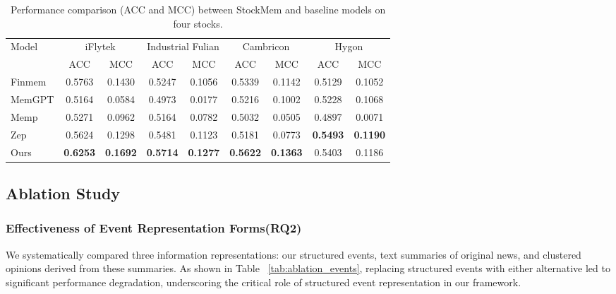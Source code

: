 \documentclass[sigconf, nonacm]{acmart} %
\begin{document}
\begin{table}[h]
\centering
\small
\caption{Performance comparison (ACC and MCC) between StockMem and baseline models on four stocks.}
\label{tab:performance_comparison}
\begin{tabular}{lcccccccc} 
\toprule
\multirow{2}{*}{Model} & \multicolumn{2}{c}{iFlytek} & \multicolumn{2}{c}{Industrial Fulian} & \multicolumn{2}{c}{Cambricon} & \multicolumn{2}{c}{Hygon} \\
\cmidrule(lr){2-3} \cmidrule(lr){4-5} \cmidrule(lr){6-7} \cmidrule(lr){8-9}
 & ACC & MCC & ACC & MCC & ACC & MCC & ACC & MCC \\
\midrule
Finmem & 0.5763 & 0.1430 & 0.5247 & 0.1056 & 0.5339 & 0.1142 & 0.5129 & 0.1052 \\
MemGPT & 0.5164 & 0.0584 & 0.4973 & 0.0177 & 0.5216 & 0.1002 & 0.5228 & 0.1068 \\
Memp & 0.5271 & 0.0962 & 0.5164 & 0.0782 & 0.5032 & 0.0505 & 0.4897 & 0.0071 \\
Zep & 0.5624 & 0.1298 & 0.5481 & 0.1123 & 0.5181 & 0.0773 & \textbf{0.5493} & \textbf{0.1190} \\
Ours & \textbf{0.6253} & \textbf{0.1692} & \textbf{0.5714} & \textbf{0.1277} & \textbf{0.5622} & \textbf{0.1363} & 0.5403& 0.1186 \\
\bottomrule
\end{tabular}
\end{table}

\subsection{Ablation Study}
\subsubsection{Effectiveness of Event Representation Forms(RQ2)}
We systematically compared three information representations: our structured events, text summaries of original news, and clustered opinions derived from these summaries. As shown in Table ~\ref{tab:ablation_events}, replacing structured events with either alternative led to significant performance degradation, underscoring the critical role of structured event representation in our framework.
\end{document}
